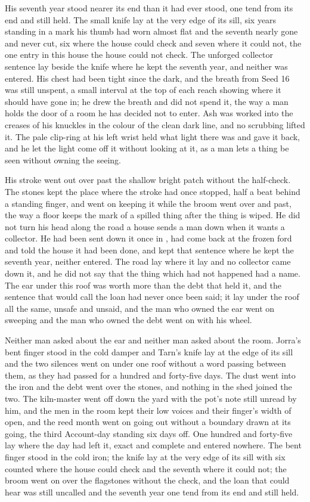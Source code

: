 His seventh year stood nearer its end than it had ever stood, one tend from its end and still held. The small knife lay at the very edge of its sill, six years standing in a mark his thumb had worn almost flat and the seventh nearly gone and never cut, six where the house could check and seven where it could not, the one entry in this house the house could not check. The unforged collector sentence lay beside the knife where he kept the seventh year, and neither was entered. His chest had been tight since the dark, and the breath from Seed 16 was still unspent, a small interval at the top of each reach showing where it should have gone in; he drew the breath and did not spend it, the way a man holds the door of a room he has decided not to enter. Ash was worked into the creases of his knuckles in the colour of the clean dark line, and no scrubbing lifted it. The pale clip-ring at his left wrist held what light there was and gave it back, and he let the light come off it without looking at it, as a man lets a thing be seen without owning the seeing.

His stroke went out over  past the shallow bright patch without the half-check. The stones kept the place where the stroke had once stopped, half a beat behind a standing finger, and went on keeping it while the broom went over and past, the way a floor keeps the mark of a spilled thing after the thing is wiped. He did not turn his head along the road a house sends a man down when it wants a collector. He had been sent down it once in , had come back at the frozen ford and told the house it had been done, and kept that sentence where he kept the seventh year, neither entered. The road lay where it lay and no collector came down it, and he did not say that the thing which had not happened had a name. The ear under this roof was worth more than the debt that held it, and the sentence that would call the loan had never once been said; it lay under the roof all the same, unsafe and unsaid, and the man who owned the ear went on sweeping and the man who owned the debt went on with his wheel.

Neither man asked about the ear and neither man asked about the room. Jorra's bent finger stood in the cold damper and Tarn's knife lay at the edge of its sill and the two silences went on under one roof without a word passing between them, as they had passed for a hundred and forty-five days. The dust went into the iron and the debt went over the stones, and nothing in the shed joined the two. The kiln-master went off down the yard with the pot's note still unread by him, and the men in the room kept their low voices and their finger's width of open, and the reed month went on going out without a boundary drawn at its going, the third Account-day standing six days off. One hundred and forty-five lay where the day had left it, exact and complete and entered nowhere. The bent finger stood in the cold iron; the knife lay at the very edge of its sill with six counted where the house could check and the seventh where it could not; the broom went on over the flagstones without the check, and the loan that could hear was still uncalled and the seventh year one tend from its end and still held.
